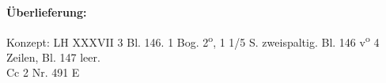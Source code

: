       
               
                \begin{ledgroupsized}[r]{120mm}
                \footnotesize 
                \pstart                
                \noindent\textbf{\"{U}berlieferung:}   
                \pend
                \end{ledgroupsized}
            
              
                            \begin{ledgroupsized}[r]{114mm}
                            \footnotesize 
                            \pstart \parindent -6mm
                            Konzept: LH XXXVII 3 Bl. 146. 1 Bog. 2\textsuperscript{o}, 1 1/5 S. zweispaltig. Bl. 146 v\textsuperscript{o} 4 Zeilen, Bl. 147 leer.\\Cc 2 Nr. 491 E \pend
                            \end{ledgroupsized}
                \vspace*{8mm}
                \pstart 
                \normalsize
